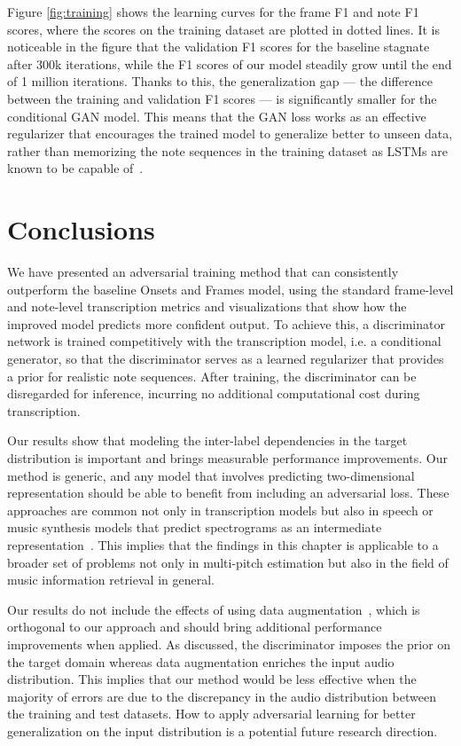 Figure \ref{fig:training} shows the learning curves for the frame F1 and note F1 scores, where the scores on the training dataset are plotted in dotted lines.
It is noticeable in the figure that the validation F1 scores for the baseline stagnate after 300k iterations, while the F1 scores of our model steadily grow until the end of 1 million iterations.
Thanks to this, the generalization gap --- the difference between the training and validation F1 scores --- is significantly smaller for the conditional GAN model.
This means that the GAN loss works as an effective regularizer that encourages the trained model to generalize better to unseen data, rather than memorizing the note sequences in the training dataset as LSTMs are known to be capable of~\cite{zaremba2015recurrent}.

\section{Conclusions}

We have presented an adversarial training method that can consistently outperform the baseline Onsets and Frames model, using the standard frame-level and note-level transcription metrics and visualizations that show how the improved model predicts more confident output.
To achieve this, a discriminator network is trained competitively with the transcription model, i.e. a conditional generator, so that the discriminator serves as a learned regularizer that provides a prior for realistic note sequences.
After training, the discriminator can be disregarded for inference, incurring no additional computational cost during transcription.


Our results show that modeling the inter-label dependencies in the target distribution is important and brings measurable performance improvements.
Our method is generic, and any model that involves predicting two-dimensional representation should be able to benefit from including an adversarial loss.
These approaches are common not only in transcription models but also in speech or music synthesis models that predict spectrograms as an intermediate representation~\cite{shen2018tacotron,kim2019synthesis}.
This implies that the findings in this chapter is applicable to a broader set of problems not only in multi-pitch estimation but also in the field of music information retrieval in general.

Our results do not include the effects of using data augmentation~\cite{hawthorne2019maestro}, which is orthogonal to our approach and should bring additional performance improvements when applied.
As discussed, the discriminator imposes the prior on the target domain whereas data augmentation enriches the input audio distribution.
This implies that our method would be less effective when the majority of errors are due to the discrepancy in the audio distribution between the training and test datasets.
How to apply adversarial learning for better generalization on the input distribution is a potential future research direction.

